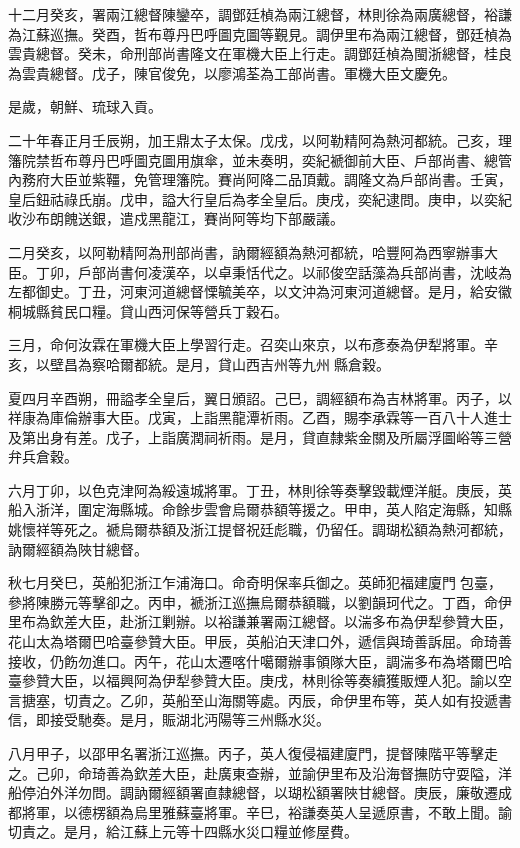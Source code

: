 \begin{pinyinscope}
十二月癸亥，署兩江總督陳鑾卒，調鄧廷楨為兩江總督，林則徐為兩廣總督，裕謙為江蘇巡撫。癸酉，哲布尊丹巴呼圖克圖等覲見。調伊里布為兩江總督，鄧廷楨為雲貴總督。癸未，命刑部尚書隆文在軍機大臣上行走。調鄧廷楨為閩浙總督，桂良為雲貴總督。戊子，陳官俊免，以廖鴻荃為工部尚書。軍機大臣文慶免。

是歲，朝鮮、琉球入貢。

二十年春正月壬辰朔，加王鼎太子太保。戊戌，以阿勒精阿為熱河都統。己亥，理籓院禁哲布尊丹巴呼圖克圖用旗傘，並未奏明，奕紀褫御前大臣、戶部尚書、總管內務府大臣並紫韁，免管理籓院。賽尚阿降二品頂戴。調隆文為戶部尚書。壬寅，皇后鈕祜祿氏崩。戊申，謚大行皇后為孝全皇后。庚戌，奕紀逮問。庚申，以奕紀收沙布朗餽送銀，遣戍黑龍江，賽尚阿等均下部嚴議。

二月癸亥，以阿勒精阿為刑部尚書，訥爾經額為熱河都統，哈豐阿為西寧辦事大臣。丁卯，戶部尚書何凌漢卒，以卓秉恬代之。以祁俊空話藻為兵部尚書，沈岐為左都御史。丁丑，河東河道總督慄毓美卒，以文沖為河東河道總督。是月，給安徽桐城縣貧民口糧。貸山西河保等營兵丁穀石。

三月，命何汝霖在軍機大臣上學習行走。召奕山來京，以布彥泰為伊犁將軍。辛亥，以壁昌為察哈爾都統。是月，貸山西吉州等九州縣倉穀。

夏四月辛酉朔，冊謚孝全皇后，翼日頒詔。己巳，調經額布為吉林將軍。丙子，以祥康為庫倫辦事大臣。戊寅，上詣黑龍潭祈雨。乙酉，賜李承霖等一百八十人進士及第出身有差。戊子，上詣廣潤祠祈雨。是月，貸直隸紫金關及所屬浮圖峪等三營弁兵倉穀。

六月丁卯，以色克津阿為綏遠城將軍。丁丑，林則徐等奏擊毀載煙洋艇。庚辰，英船入浙洋，圍定海縣城。命餘步雲會烏爾恭額等援之。甲申，英人陷定海縣，知縣姚懷祥等死之。褫烏爾恭額及浙江提督祝廷彪職，仍留任。調瑚松額為熱河都統，訥爾經額為陜甘總督。

秋七月癸巳，英船犯浙江乍浦海口。命奇明保率兵御之。英師犯福建廈門包臺，參將陳勝元等擊卻之。丙申，褫浙江巡撫烏爾恭額職，以劉韻珂代之。丁酉，命伊里布為欽差大臣，赴浙江剿辦。以裕謙兼署兩江總督。以湍多布為伊犁參贊大臣，花山太為塔爾巴哈臺參贊大臣。甲辰，英船泊天津口外，遞信與琦善訴屈。命琦善接收，仍飭勿進口。丙午，花山太遷喀什噶爾辦事領隊大臣，調湍多布為塔爾巴哈臺參贊大臣，以福興阿為伊犁參贊大臣。庚戌，林則徐等奏續獲販煙人犯。諭以空言搪塞，切責之。乙卯，英船至山海關等處。丙辰，命伊里布等，英人如有投遞書信，即接受馳奏。是月，賑湖北沔陽等三州縣水災。

八月甲子，以邵甲名署浙江巡撫。丙子，英人復侵福建廈門，提督陳階平等擊走之。己卯，命琦善為欽差大臣，赴廣東查辦，並諭伊里布及沿海督撫防守耍隘，洋船停泊外洋勿問。調訥爾經額署直隸總督，以瑚松額署陜甘總督。庚辰，廉敬遷成都將軍，以德楞額為烏里雅蘇臺將軍。辛巳，裕謙奏英人呈遞原書，不敢上聞。諭切責之。是月，給江蘇上元等十四縣水災口糧並修屋費。


\end{pinyinscope}
